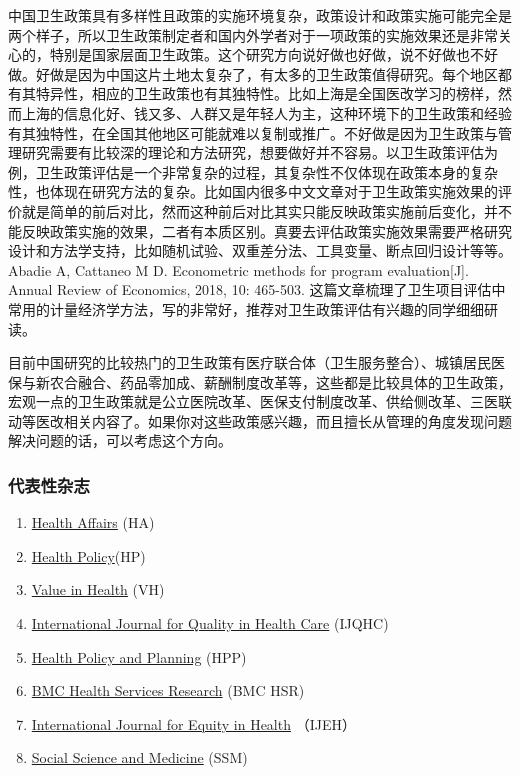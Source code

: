 \documentclass[11pt, a4paper]{article}
\begin{document}
中国卫生政策具有多样性且政策的实施环境复杂，政策设计和政策实施可能完全是两个样子，所以卫生政策制定者和国内外学者对于一项政策的实施效果还是非常关心的，特别是国家层面卫生政策。这个研究方向说好做也好做，说不好做也不好做。好做是因为中国这片土地太复杂了，有太多的卫生政策值得研究。每个地区都有其特异性，相应的卫生政策也有其独特性。比如上海是全国医改学习的榜样，然而上海的信息化好、钱又多、人群又是年轻人为主，这种环境下的卫生政策和经验有其独特性，在全国其他地区可能就难以复制或推广。不好做是因为卫生政策与管理研究需要有比较深的理论和方法研究，想要做好并不容易。以卫生政策评估为例，卫生政策评估是一个非常复杂的过程，其复杂性不仅体现在政策本身的复杂性，也体现在研究方法的复杂。比如国内很多中文文章对于卫生政策实施效果的评价就是简单的前后对比，然而这种前后对比其实只能反映政策实施前后变化，并不能反映政策实施的效果，二者有本质区别。真要去评估政策实施效果需要严格研究设计和方法学支持，比如随机试验、双重差分法、工具变量、断点回归设计等等。Abadie A, Cattaneo M D. Econometric methods for program evaluation[J]. Annual Review of Economics, 2018, 10: 465-503. 这篇文章梳理了卫生项目评估中常用的计量经济学方法，写的非常好，推荐对卫生政策评估有兴趣的同学细细研读。

目前中国研究的比较热门的卫生政策有医疗联合体（卫生服务整合）、城镇居民医保与新农合融合、药品零加成、薪酬制度改革等，这些都是比较具体的卫生政策，宏观一点的卫生政策就是公立医院改革、医保支付制度改革、供给侧改革、三医联动等医改相关内容了。如果你对这些政策感兴趣，而且擅长从管理的角度发现问题解决问题的话，可以考虑这个方向。

\subsubsection{代表性杂志}

\begin{enumerate}[(1)]
	\item \href{http://www.healthaffairs.org/}{Health Affairs} (HA)
	\item \href{http://www.healthpolicyjrnl.com/}{Health Policy}(HP)
	\item \href{http://www.valueinhealthjournal.com}{Value in Health} (VH)
	\item \href{https://academic.oup.com/intqhc}{International Journal for Quality in Health Care} (IJQHC)
	\item \href{http://heapol.oxfordjournals.org}{Health Policy and Planning} (HPP)
	\item \href{https://bmchealthservres.biomedcentral.com/}{BMC Health Services Research} (BMC HSR)
	\item \href{https://equityhealthj.biomedcentral.com/}{International Journal for Equity in Health} （IJEH）
	\item \href{http://www.sciencedirect.com/science/journal/02779536}{Social Science and Medicine} (SSM)
\end{enumerate}
\end{document}
